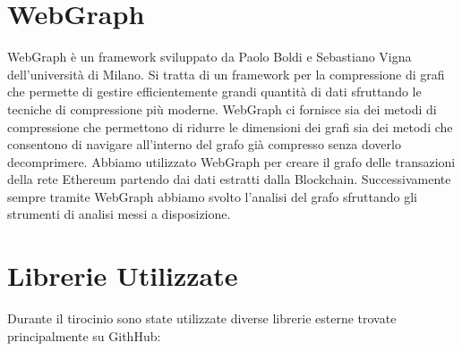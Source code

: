 \documentclass[12pt]{report}
\begin{document}
\section{WebGraph}

WebGraph \cite{WebGraph} è un framework sviluppato da Paolo Boldi e Sebastiano Vigna dell'università di Milano.
Si tratta di un framework per la compressione di grafi che permette di gestire efficientemente grandi quantità di dati sfruttando le tecniche di compressione più moderne.
WebGraph ci fornisce sia dei metodi di compressione che permettono di ridurre le dimensioni dei grafi sia dei metodi che consentono di navigare all'interno del grafo già compresso senza doverlo decomprimere.
Abbiamo utilizzato WebGraph per creare il grafo delle transazioni della rete Ethereum partendo dai dati estratti dalla Blockchain.
Successivamente sempre tramite WebGraph abbiamo svolto l'analisi del grafo sfruttando gli strumenti di analisi messi a disposizione.


\section{Librerie Utilizzate}

Durante il tirocinio sono state utilizzate diverse librerie esterne trovate principalmente su GithHub:
\end{document}
